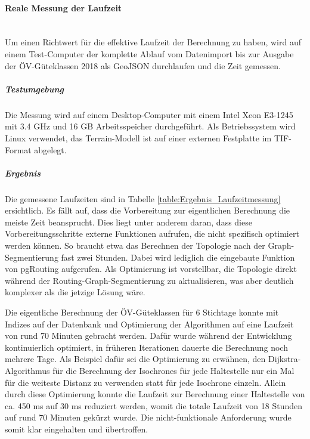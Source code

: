 \paragraph{Reale Messung der Laufzeit}~\\
Um einen Richtwert für die effektive Laufzeit der Berechnung zu haben, wird auf einem Test-Computer der komplette Ablauf vom Datenimport bis zur Ausgabe der \gls{ÖV-Güteklassen} 2018 als \gls{GeoJSON} durchlaufen und die Zeit gemessen.

\subparagraph{Testumgebung}
Die Messung wird auf einem Desktop-Computer mit einem Intel Xeon E3-1245 mit 3.4 GHz und 16 GB Arbeitsspeicher durchgeführt.
Als Betriebssystem wird Linux verwendet, das Terrain-Modell ist auf einer externen Festplatte im TIF-Format abgelegt.

\subparagraph{Ergebnis}

Die gemessene Laufzeiten sind in Tabelle \ref{table:Ergebnis_Laufzeitmessung} ersichtlich.
Es fällt auf, dass die Vorbereitung zur eigentlichen Berechnung die meiste Zeit beansprucht.
Dies liegt unter anderem daran, dass diese Vorbereitungsschritte externe Funktionen aufrufen, die nicht spezifisch optimiert werden können.
So braucht etwa das Berechnen der Topologie nach der Graph-Segmentierung fast zwei Stunden.
Dabei wird lediglich die eingebaute Funktion von pgRouting aufgerufen.
Als Optimierung ist vorstellbar, die Topologie direkt während der \gls{Routing-Graph}-Segmentierung zu aktualisieren, was aber deutlich komplexer als die jetzige Lösung wäre.

Die eigentliche Berechnung der \gls{ÖV-Güteklassen} für 6 Stichtage konnte mit Indizes auf der Datenbank und Optimierung der Algorithmen auf eine Laufzeit von rund 70 Minuten gebracht werden.
Dafür wurde während der Entwicklung kontinuierlich optimiert, in früheren Iterationen dauerte die Berechnung noch mehrere Tage.
Als Beispiel dafür sei die Optimierung zu erwähnen, den \gls{Dijkstra-Algorithmus} für die Berechnung der \glspl{Isochrone} für jede \gls{Haltestelle} nur ein Mal für die weiteste Distanz zu verwenden statt für jede \gls{Isochrone} einzeln.
Allein durch diese Optimierung konnte die Laufzeit zur Berechnung einer \gls{Haltestelle} von ca. 450 ms auf 30 ms reduziert werden, womit die totale Laufzeit von 18 Stunden auf rund 70 Minuten gekürzt wurde.
Die nicht-funktionale Anforderung  wurde somit klar eingehalten und übertroffen.

